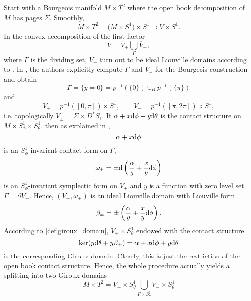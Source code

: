 Start with a Bourgeois manifold $M \times T^2$ where the open book decomposition of $M$ has pages $\Sigma$.
Smoothly,
\[
    M \times T^2 
    = \big(M \times S^1\big) \times S^1 
    \eqqcolon V \times S^1.
\]
In the convex decomposition of the first factor
\[
    V = V_+ \bigcup_\Gamma \overline{V}_-,
\]
where $\Gamma$ is the dividing set, $V_\pm$ turn out to be ideal Liouville domains according to \cite[Section 6]{DG12}.
In \cite[Section 5.3]{DG12}, the authors explicitly compute $\Gamma$ and 
$V_\pm$ for the Bourgeois construction and obtain %
\[
    \Gamma = \{y = 0\} = p^{-1}(\{0\}) \cup_B p^{-1}(\{\pi\})
\]
and
\[
    V_+ = p^{-1}([0, \pi]) \times S^1, \qquad V_- = p^{-1}([\pi, 2\pi]) \times S^1,
\]
i.e. topologically $V_\pm = \Sigma \times D^*S_1$.
If $\alpha + x \mathrm{d} \phi + y \mathrm{d} \theta$ is the contact structure on $M\times S^1_\phi \times S^1_\theta$,
then as explained in \cite[Section 5.3]{DG12}, 
\[ 
\alpha + x \mathrm{d} \phi
\] 
is an 
$S^1_\phi$-invariant contact form on $\Gamma$,
\[
    \omega_\pm = \pm \mathrm{d} \left(\frac{\alpha}{y} + \frac{x}{y}\mathrm{d} \phi\right) 
\]
is an $S^1_\phi$-invariant symplectic form on $V_\pm$ and
$y$ is a function with zero level set $\Gamma = \partial V_\pm$.
Hence, $(V_\pm, \omega_\pm)$ is an ideal Liouville domain with Liouville form
\[
    \beta_\pm = \pm \left(\frac{\alpha}{y} + \frac{x}{y}\mathrm{d} \phi\right).
\]
According to \cref{def:giroux_domain}, $V_\pm \times S^1_\theta$
endowed with the contact structure 
\[
    \ker(y \mathrm{d} \theta + y \beta_\pm) = \alpha + x \mathrm{d} \phi + y \mathrm{d} \theta
\]
is the corresponding Giroux domain. Clearly, this is just the restriction
of the open book contact structure. Hence, the whole procedure actually yields a
splitting into two Giroux domains
\[
    M\times T^2 = V_+ \times S^1_\theta 
    \bigcup_{\Gamma \times S^1_\theta} V_- \times S^1_\theta
\]